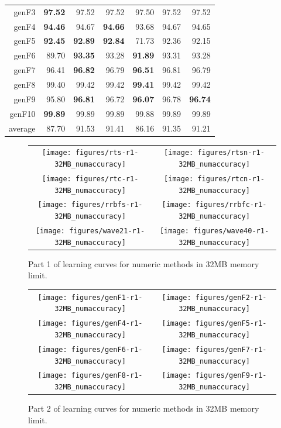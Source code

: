 \begin{table}
\begin{tabular}{|r||r|r|r||r|r|r|}
{\sc genF3} & \textbf{97.52} & 97.52 & 97.52 & 97.50 & 97.52 & 97.52 \\
{\sc genF4} & \textbf{94.46} & 94.67 & \textbf{94.66} & 93.68 & 94.67 & 94.65 \\
{\sc genF5} & \textbf{92.45} & \textbf{92.89} & \textbf{92.84} & 71.73 & 92.36 & 92.15 \\
{\sc genF6} & 89.70 & \textbf{93.35} & 93.28 & \textbf{91.89} & 93.31 & 93.28 \\
{\sc genF7} & 96.41 & \textbf{96.82} & 96.79 & \textbf{96.51} & 96.81 & 96.79 \\
{\sc genF8} & 99.40 & 99.42 & 99.42 & \textbf{99.41} & 99.42 & 99.42 \\
{\sc genF9} & 95.80 & \textbf{96.81} & 96.72 & \textbf{96.07} & 96.78 & \textbf{96.74} \\
{\sc genF10} & \textbf{99.89} & 99.89 & 99.89 & 99.88 & 99.89 & 99.89 \\
\hline
average & 87.70 & 91.53 & 91.41 & 86.16 & 91.35 & 91.21 \\
\hline
\end{tabular}
\end{table}

\begin{figure}
\centering
\begin{tabular}{c@{}c}
\texttt{[image: figures/rts-r1-32MB\_numaccuracy]} &
\texttt{[image: figures/rtsn-r1-32MB\_numaccuracy]} \\
\texttt{[image: figures/rtc-r1-32MB\_numaccuracy]} &
\texttt{[image: figures/rtcn-r1-32MB\_numaccuracy]} \\
\texttt{[image: figures/rrbfs-r1-32MB\_numaccuracy]} &
\texttt{[image: figures/rrbfc-r1-32MB\_numaccuracy]} \\
\texttt{[image: figures/wave21-r1-32MB\_numaccuracy]} &
\texttt{[image: figures/wave40-r1-32MB\_numaccuracy]} \\
\end{tabular}
\caption{Part 1 of learning curves for numeric methods in 32MB memory limit.}
\label{fig:32MB_num1}
\end{figure}

\begin{figure}
\centering
\begin{tabular}{c@{}c}
\texttt{[image: figures/genF1-r1-32MB\_numaccuracy]} &
\texttt{[image: figures/genF2-r1-32MB\_numaccuracy]} \\
\texttt{[image: figures/genF4-r1-32MB\_numaccuracy]} &
\texttt{[image: figures/genF5-r1-32MB\_numaccuracy]} \\
\texttt{[image: figures/genF6-r1-32MB\_numaccuracy]} &
\texttt{[image: figures/genF7-r1-32MB\_numaccuracy]} \\
\texttt{[image: figures/genF8-r1-32MB\_numaccuracy]} &
\texttt{[image: figures/genF9-r1-32MB\_numaccuracy]} \\
\end{tabular}
\caption{Part 2 of learning curves for numeric methods in 32MB memory limit.}
\label{fig:32MB_num2}
\end{figure}

